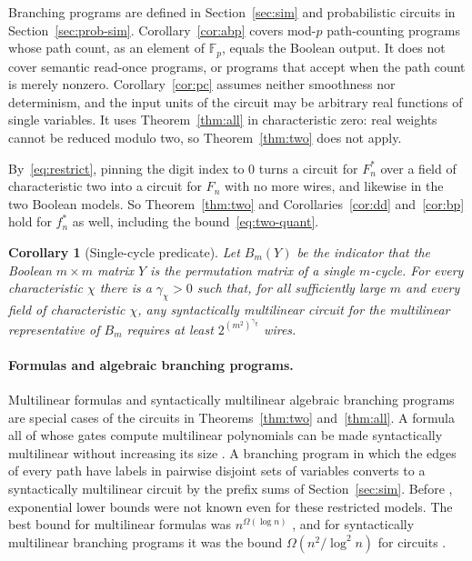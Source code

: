 \documentclass[11pt]{article}
\newtheorem{corollary}[theorem]{Corollary}
\theoremstyle{remark}
\newcommand{\F}{\mathbb F}
\begin{document}
Branching programs are defined in Section~\ref{sec:sim} and
probabilistic circuits in Section~\ref{sec:prob-sim}.
Corollary~\ref{cor:abp} covers mod-\(p\) path-counting programs whose path
count, as an element of \(\F_p\), equals the Boolean output. It does not
cover semantic read-once programs, or programs that accept when the path
count is merely nonzero. Corollary~\ref{cor:pc} assumes neither
smoothness nor determinism, and the input units of the circuit may be
arbitrary real functions of single variables. It uses
Theorem~\ref{thm:all} in characteristic zero: real weights cannot be
reduced modulo two, so Theorem~\ref{thm:two} does not apply.

By~\eqref{eq:restrict}, pinning the digit index to \(0\) turns a circuit
for \(F^*_n\) over a field of characteristic two into a circuit for
\(F_n\) with no more wires, and likewise in the two Boolean models. So
Theorem~\ref{thm:two} and Corollaries~\ref{cor:dd} and~\ref{cor:bp} hold
for \(f^*_n\) as well, including the bound~\eqref{eq:two-quant}.

\begin{corollary}[Single-cycle predicate]\label{cor:cycle}
Let \(B_m(Y)\) be the indicator that the Boolean \(m\times m\) matrix
\(Y\) is the permutation matrix of a single \(m\)-cycle. For every
characteristic \(\chi\) there is a \(\gamma_\chi>0\) such that, for all
sufficiently large \(m\) and every field of characteristic \(\chi\), any
syntactically multilinear circuit for the multilinear representative of
\(B_m\) requires at least \(2^{(m^2)^{\gamma_\chi}}\) wires.
\end{corollary}

\paragraph{Formulas and algebraic branching programs.}
Multilinear formulas and syntactically multilinear algebraic branching
programs are special cases of the circuits in Theorems~\ref{thm:two}
and~\ref{thm:all}. A formula all of whose gates compute multilinear
polynomials can be made syntactically multilinear without increasing its
size \cite{raz}. A branching program in which the edges of every path
have labels in pairwise disjoint sets of variables converts to a
syntactically multilinear circuit by the prefix sums of
Section~\ref{sec:sim}. Before \cite{hc}, exponential lower bounds were
not known even for these restricted models. The best bound for
multilinear formulas was \(n^{\Omega(\log n)}\) \cite{raz}, and for
syntactically multilinear branching programs it was the bound
\(\Omega(n^2/\log^2n)\) for circuits \cite{akv}.
\end{document}
